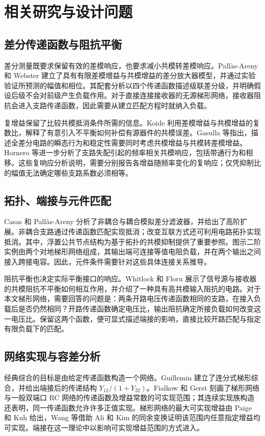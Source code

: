 \section{相关研究与设计问题}
\label{sec:related-work}

\subsection{差分传递函数与阻抗平衡}
差分测量既要求保留有效的差模响应，也要求减小共模转差模响应。Pall\`as-Areny 和 Webster 建立了具有有限差模增益与共模增益的差分放大器模型，并通过实验验证所预测的幅值和相位\citep{pallasareny1991cmrr}。其配套分析以四个传递函数描述级联差分级，并明确假设后级不会对前级产生负载作用\citep{pallasareny1991cascaded}。对于直接连接接收器的无源梯形网络，接收器阻抗会进入支路传递函数，因此需要从建立匹配方程时就纳入负载。

复增益保留了比较共模抵消条件所需的信息。Koide 利用差模增益与共模增益的复数比，解释了有意引入不平衡如何补偿有源器件的共模误差\citep{koide1997redef}。Gasulla 等指出，描述全差分电路的瞬态行为和稳定性需要同时考虑共模增益与共模转差模增益\citep{gasulla2002cmresp}。Hornero 等进一步分析了支路失配引起的频率相关共模响应，包括带通行为和相移\citep{hornero2021cm}。这些复响应分析说明，需要分别报告各增益随频率变化的复响应；仅凭抑制比的幅值无法确定哪些支路系数必须相等。

\subsection{拓扑、端接与元件匹配}
Casas 和 Pall\`as-Areny 分析了非耦合与耦合模拟差分滤波器，并给出了高阶扩展\citep{casas1996basics}。非耦合支路通过传递函数匹配实现抵消；改变互联方式还可利用电路拓扑实现抵消。其中，浮置公共节点结构为基于拓扑的共模抑制提供了重要参照。图示二阶实例由两个对地梯形网络组成，其输出端可连接等值电阻负载，并在两个输出之间接入跨接电容。因此，元件条件需要针对这些具体连接关系推导。

阻抗平衡也决定实际平衡接口的响应。Whitlock 和 Floru 展示了信号源与接收器的共模阻抗不平衡如何相互作用，并介绍了一种具有高共模输入阻抗的电路\citep{whitlock2004balancedinput}。对于本文梯形网络，需要回答的问题是：两条开路电压传递函数相同的支路，在接入负载后是否仍然相同？开路传递函数确定电压比，输出阻抗确定所接负载如何改变这一电压比。保留这两个函数，便可显式描述端接的影响，直接比较开路匹配与指定有限负载下的匹配。

\subsection{网络实现与容差分析}
经典综合的目标是由给定传递函数构造一个网络。Guillemin 建立了连分式梯形综合，并给出端接后的传递结构 $Y_{12}/(1+Y_{22})$\citep{guillemin1949rcsynthesis}。Fialkow 和 Gerst 刻画了梯形网络与一般双端口 RC 网络的传递函数及增益常数的可实现范围\citep{fialkow1951rcladder,fialkow1952rcnetworks}；其连续实现族构造还表明，同一传递函数允许许多正值实现。梯形网络的最大可实现增益由 Paige 和 Kuh 给出，Wang 等借助 Ali 和 Kim 的同余变换证明该范围内任意指定增益均可实现\citep{paige1960maximum,wang2017rcladder,ali1975continuous}。端接在这一理论中以影响可实现增益范围的方式进入\citep{fialkow1951rcladder,fialkow1952rcnetworks}。

